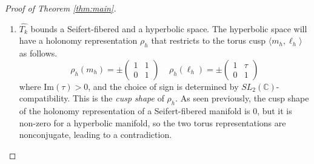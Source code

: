 \documentclass{article}
\theoremstyle{plain}
\theoremstyle{definition}
\theoremstyle{plain}
\theoremstyle{plain}
\theoremstyle{plain}
\theoremstyle{remark}
\theoremstyle{remark}
\theoremstyle{plain}
\theoremstyle{plain}
\begin{document}
\begin{proof}[Proof of Theorem \ref{thm:main}]
\begin{enumerate}
		\begin{equation}
			\rho_k'(m_k) = \pm\begin{pmatrix}1&1\\0&1 \end{pmatrix} \ \ \ \ \ \rho_k'(\ell_k') = \pm\begin{pmatrix}1&0\\0&1\end{pmatrix}
		\end{equation}
		for $k = 1, 2$ and a choice of sign determined by $SL_2(\mathbb{C})$-compatibility. By Proposition 1.6.2 of \cite{Aschenbrenner20123ManifoldG}, the regular fibers don't match, i.e. if $\varphi: \langle m_1, \ell_2 \rangle \to \langle m_2, \ell_2 \rangle$ is the gluing map, then $\varphi(\ell_1) \neq \ell_2$. Thus, $\varphi^{-1}(\ell_2)$ is a nontrivial simple closed curve in $\pi_1(\widehat{T}_{k_1})$ that is not $\ell_1$; this means it must be of the form $m_1^p\ell_1^q$ with $p \neq 0$. However, 
		\begin{equation}
			\rho_1'(m_1^p\ell_1^q) = \pm \begin{pmatrix}1&p\\0&1\end{pmatrix} \neq \pm \begin{pmatrix}1&0\\0&1\end{pmatrix}
		\end{equation}
		which means that the two representations are not conjugate under the gluing map $\varphi$. This contradicts the assertion that $\alpha_\infty$ is the trace of some $\rho_\infty: \pi_1(M) \to SL_2(\mathbb{C})$. 
		\item $\widehat{T_k}$ bounds a Seifert-fibered and a hyperbolic space. The hyperbolic space will have a holonomy representation $\rho_h$ that restricts to the torus cusp $\langle m_h, \ell_h \rangle$ as follows. 
		\begin{equation}
			\rho_h(m_h) = \pm\begin{pmatrix}1&1\\0&1\end{pmatrix} \ \ \ \ \ \rho_h(\ell_h) = \pm\begin{pmatrix}1&\tau\\0&1\end{pmatrix}
		\end{equation}
		where $\text{Im}(\tau) > 0$, and the choice of sign is determined by $SL_2(\mathbb{C})$-compatibility. This is the \emph{cusp shape} of $\rho_h$. As seen previously, the cusp shape of the holonomy representation of a Seifert-fibered manifold is 0, but it is non-zero for a hyperbolic manifold, so the two torus representations are nonconjugate, leading to a contradiction.  

\end{enumerate}
\end{proof}
\end{document}

